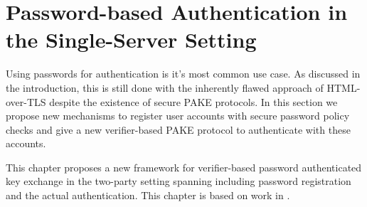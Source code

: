 \chapter{Password-based Authentication in the Single-Server Setting} \label{ch:vpake}
Using passwords for authentication is it's most common use case.
As discussed in the introduction, this is still done with the inherently flawed approach of \ac{HTML}-over-\ac{TLS} despite the existence of secure \ac{PAKE} protocols.
In this section we propose new mechanisms to register user accounts with secure password policy checks and give a new verifier-based \ac{PAKE} protocol to authenticate with these accounts.

This chapter proposes a new framework for verifier-based password authenticated key exchange in the two-party setting spanning including password registration and the actual authentication.
This chapter is based on work in \cite{Kiefer13a,Kiefer2012,KieferM14b,KieferM15a,DongK15a,ManulisSKD15a}.










